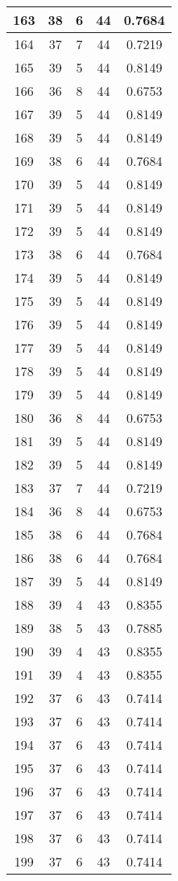 \documentclass[letterpaper, 12pt]{article}
\begin{document}
\begin{longtable}{|c|c|c|c|c|}
\hline
163 & 38 & 6 & 44 & 0.7684 \\
\hline
164 & 37 & 7 & 44 & 0.7219 \\
\hline
165 & 39 & 5 & 44 & 0.8149 \\
\hline
166 & 36 & 8 & 44 & 0.6753 \\
\hline
167 & 39 & 5 & 44 & 0.8149 \\
\hline
168 & 39 & 5 & 44 & 0.8149 \\
\hline
169 & 38 & 6 & 44 & 0.7684 \\
\hline
170 & 39 & 5 & 44 & 0.8149 \\
\hline
171 & 39 & 5 & 44 & 0.8149 \\
\hline
172 & 39 & 5 & 44 & 0.8149 \\
\hline
173 & 38 & 6 & 44 & 0.7684 \\
\hline
174 & 39 & 5 & 44 & 0.8149 \\
\hline
175 & 39 & 5 & 44 & 0.8149 \\
\hline
176 & 39 & 5 & 44 & 0.8149 \\
\hline
177 & 39 & 5 & 44 & 0.8149 \\
\hline
178 & 39 & 5 & 44 & 0.8149 \\
\hline
179 & 39 & 5 & 44 & 0.8149 \\
\hline
180 & 36 & 8 & 44 & 0.6753 \\
\hline
181 & 39 & 5 & 44 & 0.8149 \\
\hline
182 & 39 & 5 & 44 & 0.8149 \\
\hline
183 & 37 & 7 & 44 & 0.7219 \\
\hline
184 & 36 & 8 & 44 & 0.6753 \\
\hline
185 & 38 & 6 & 44 & 0.7684 \\
\hline
186 & 38 & 6 & 44 & 0.7684 \\
\hline
187 & 39 & 5 & 44 & 0.8149 \\
\hline
188 & 39 & 4 & 43 & 0.8355 \\
\hline
189 & 38 & 5 & 43 & 0.7885 \\
\hline
190 & 39 & 4 & 43 & 0.8355 \\
\hline
191 & 39 & 4 & 43 & 0.8355 \\
\hline
192 & 37 & 6 & 43 & 0.7414 \\
\hline
193 & 37 & 6 & 43 & 0.7414 \\
\hline
194 & 37 & 6 & 43 & 0.7414 \\
\hline
195 & 37 & 6 & 43 & 0.7414 \\
\hline
196 & 37 & 6 & 43 & 0.7414 \\
\hline
197 & 37 & 6 & 43 & 0.7414 \\
\hline
198 & 37 & 6 & 43 & 0.7414 \\
\hline
199 & 37 & 6 & 43 & 0.7414 \\
\hline
\end{longtable}
\end{document}
